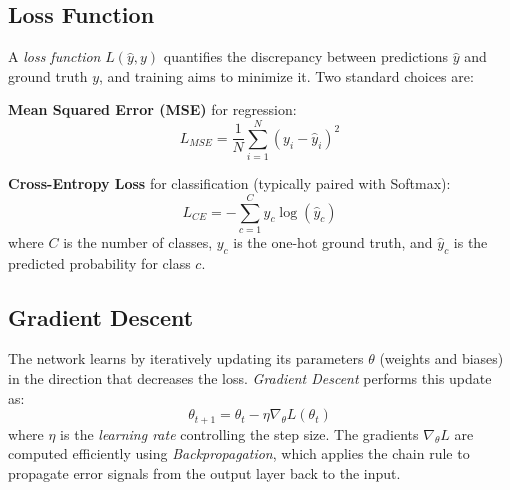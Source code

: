 \subsection{Loss Function}
A \textit{loss function} $L(\hat{y}, y)$ quantifies the discrepancy between predictions $\hat{y}$ and ground truth $y$, and training aims to minimize it. Two standard choices are:

\textbf{Mean Squared Error (MSE)} for regression:
\begin{equation}
    L_{MSE} = \frac{1}{N} \sum_{i=1}^{N} (y_i - \hat{y}_i)^2
\end{equation}

\textbf{Cross-Entropy Loss} for classification (typically paired with Softmax):
\begin{equation}
    L_{CE} = - \sum_{c=1}^{C} y_c \log(\hat{y}_c)
\end{equation}
where $C$ is the number of classes, $y_c$ is the one-hot ground truth, and $\hat{y}_c$ is the predicted probability for class $c$.

\subsection{Gradient Descent}
The network learns by iteratively updating its parameters $\theta$ (weights and biases) in the direction that decreases the loss. \textit{Gradient Descent} performs this update as:
\begin{equation}
    \theta_{t+1} = \theta_{t} - \eta \nabla_\theta L(\theta_t)
\end{equation}
where $\eta$ is the \textit{learning rate} controlling the step size. The gradients $\nabla_\theta L$ are computed efficiently using \textit{Backpropagation}, which applies the chain rule to propagate error signals from the output layer back to the input.